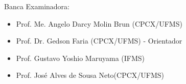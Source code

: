 \vspace{2cm}
Banca Examinadora:

\begin{itemize}
	\item Prof. Me. Angelo Darcy Molin Brun (CPCX/UFMS) 
	\item Prof. Dr. Gedson Faria (CPCX/UFMS) - Orientador
	\item Prof. Gustavo Yoshio Maruyama (IFMS)
	\item Prof. José Alves de Sousa Neto(CPCX/UFMS)
\end{itemize}
